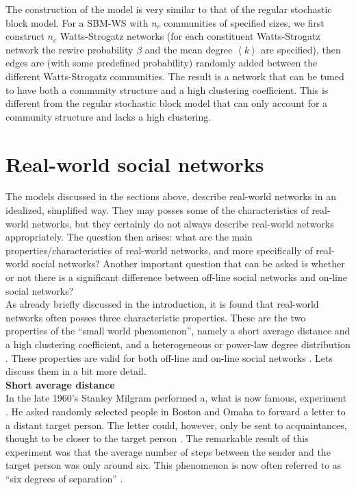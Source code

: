 \documentclass[11 pt , letterpaper , twoside , openright]{book}
\begin{document}
\newline
The construction of the model is very similar to that of the regular stochastic block model. For a SBM-WS with $n_c$ communities of specified sizes, we first construct $n_c$ Watts-Strogatz networks (for each constituent Watts-Strogatz network the rewire probability $\beta$ and the mean degree $\left<k\right>$ are specified), then edges are (with some predefined probability) randomly added between the different Watts-Strogatz communities. The result is a network that can be tuned to have both a community structure and a high clustering coefficient. This is different from the regular stochastic block model that can only account for a community structure and lacks a high clustering.

\section{Real-world social networks}
The models discussed in the sections above, describe real-world networks in an idealized, simplified way. They may posses some of the characteristics of real-world networks, but they certainly do not always describe real-world networks appropriately. The question then arises: what are the main properties/characteristics of real-world networks, and more specifically of real-world social networks? Another important question that can be asked is whether or not there is a significant difference between off-line social networks and on-line social networks?\\
\newline
As already briefly discussed in the introduction, it is found that real-world networks often posses three characteristic properties. These are the two properties of the ``small world phenomenon'', namely a short average distance and a high clustering coefficient, and a heterogeneous or power-law degree distribution \cite{RealWorld}. These properties are valid for both off-line and on-line social networks \cite{Zhang2014}. Lets discuss them in a bit more detail.\\
\newline
\textbf{Short average distance}\\
\newline
In the late 1960's Stanley Milgram performed a, what is now famous, experiment \cite{Newman2003}. He asked randomly selected people in Boston and Omaha to forward a letter to a distant target person. The letter could, however, only be sent to acquaintances, thought to be closer to the target person \cite{RealWorld}. The remarkable result of this experiment was that the average number of steps between the sender and the target person was only around six. This phenomenon is now often referred to as ``six degrees of separation'' \cite{RealWorld}.\\
\end{document}
